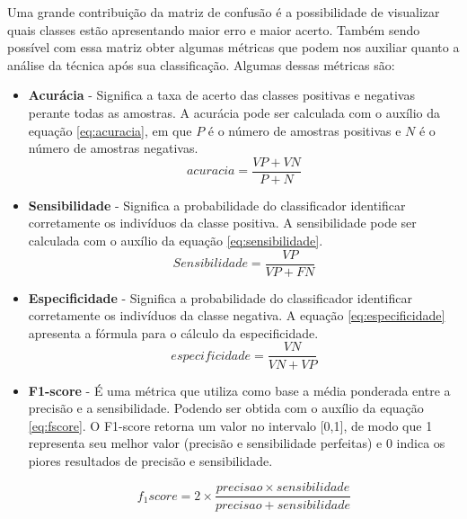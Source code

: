Uma grande contribuição da matriz de confusão é a possibilidade de visualizar quais classes estão apresentando maior erro e maior acerto. Também sendo possível com essa matriz obter algumas métricas que podem nos auxiliar quanto a análise da técnica após sua classificação. Algumas dessas métricas são:

\begin{itemize}

\item \textbf{Acurácia} - Significa a taxa de acerto das classes positivas e negativas perante todas as amostras. A acurácia pode ser calculada com o auxílio da equação \ref{eq:acuracia}, em que $P$ é o número de amostras positivas e $N$ é o número de amostras negativas. 
\begin{equation}
acuracia = \frac{VP + VN}{P + N}
\label{eq:acuracia}
\end{equation}

\item \textbf{Sensibilidade} - Significa a probabilidade do classificador	identificar corretamente os indivíduos da classe positiva. A sensibilidade pode ser calculada com o auxílio da equação \ref{eq:sensibilidade}.
\begin{equation}
Sensibilidade = \frac{VP}{VP + FN} 
\label{eq:sensibilidade}
\end{equation}

\item \textbf{Especificidade} - Significa a probabilidade do classificador identificar corretamente os indivíduos da classe negativa. A equação \ref{eq:especificidade} apresenta a fórmula para o cálculo da especificidade. 
\begin{equation}
especificidade = \frac{VN}{VN + VP}
\label{eq:especificidade}
\end{equation}


\item \textbf{F1-score} - É uma métrica que utiliza como base a média ponderada entre a precisão e a sensibilidade. Podendo ser obtida com o auxílio da equação \ref{eq:fscore}. O F1-score retorna um valor no intervalo [0,1], de modo que 1 representa seu melhor valor (precisão e sensibilidade perfeitas) e 0 indica os piores resultados de precisão e sensibilidade. 

\begin{equation}
f_1score = 2 \times \frac{precisao\times sensibilidade}{precisao + sensibilidade}
\label{eq:fscore}
\end{equation}


\end{itemize}
